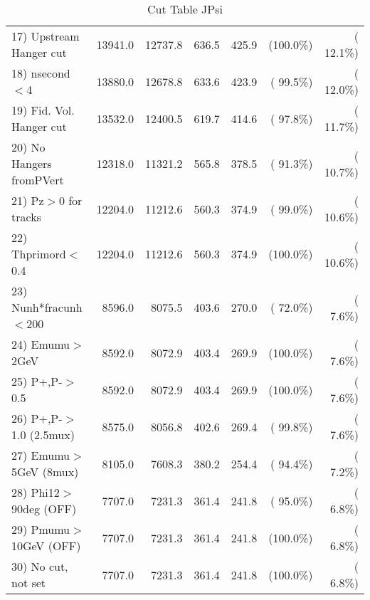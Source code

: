 \begin{table}[h!]
\begin{tabular}{||l||r|r|r|r|r|r||}
 17) Upstream Hanger cut  &      13941.0 &      12737.8 &        636.5 &        425.9 & (100.0\%) & ( 12.1\%) \\
 18) nsecond$<$4          &      13880.0 &      12678.8 &        633.6 &        423.9 & ( 99.5\%) & ( 12.0\%) \\
 19) Fid. Vol. Hanger cut &      13532.0 &      12400.5 &        619.7 &        414.6 & ( 97.8\%) & ( 11.7\%) \\
 20) No Hangers fromPVert &      12318.0 &      11321.2 &        565.8 &        378.5 & ( 91.3\%) & ( 10.7\%) \\
 21) Pz$>$0 for tracks    &      12204.0 &      11212.6 &        560.3 &        374.9 & ( 99.0\%) & ( 10.6\%) \\
 22) Thprimord$<$0.4      &      12204.0 &      11212.6 &        560.3 &        374.9 & (100.0\%) & ( 10.6\%) \\
 23) Nunh*fracunh$<$200   &       8596.0 &       8075.5 &        403.6 &        270.0 & ( 72.0\%) & (  7.6\%) \\
 24) Emumu$>$2GeV         &       8592.0 &       8072.9 &        403.4 &        269.9 & (100.0\%) & (  7.6\%) \\
 25) P+,P-$>$0.5          &       8592.0 &       8072.9 &        403.4 &        269.9 & (100.0\%) & (  7.6\%) \\
 26) P+,P-$>$1.0 (2.5mux) &       8575.0 &       8056.8 &        402.6 &        269.4 & ( 99.8\%) & (  7.6\%) \\
 27) Emumu$>$5GeV  (8mux) &       8105.0 &       7608.3 &        380.2 &        254.4 & ( 94.4\%) & (  7.2\%) \\
 28) Phi12$>$90deg  (OFF) &       7707.0 &       7231.3 &        361.4 &        241.8 & ( 95.0\%) & (  6.8\%) \\
 29) Pmumu$>$10GeV  (OFF) &       7707.0 &       7231.3 &        361.4 &        241.8 & (100.0\%) & (  6.8\%) \\
 30) No cut, not set      &       7707.0 &       7231.3 &        361.4 &        241.8 & (100.0\%) & (  6.8\%) \\
 \hline
 \hline
 \end{tabular}
 \caption{Cut Table  JPsi     }
 \label{tab-cutcohjpsi-mumu_cohrhop}
 \end{table}
